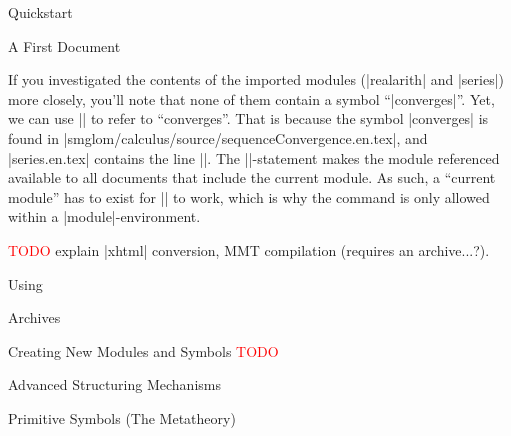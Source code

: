 \begin{sfragment}{Quickstart}
\begin{sfragment}{A First \sTeX Document}
    \begin{function}{\importmodule}
      If you investigated the contents of the imported modules 
      (|realarith| and |series|) more closely, you'll note that
      none of them contain a symbol ``|converges|''. Yet, we
      can use |\symref| to refer to ``converges''. That is because
      the symbol |converges| is found in 
      |smglom/calculus/source/sequenceConvergence.en.tex|, and
      |series.en.tex| contains the line
      ||. The |\importmodule|-statement
      makes the module referenced available to all documents
      that include the current module. As such, a ``current module''
      has to exist for |\importmodule| to work, which is why the command
      is only allowed within a |module|-environment.
    \end{function}

    \textcolor{red}{TODO} explain |xhtml| conversion, MMT compilation
    (requires an archive...?).

	\end{sfragment}
\end{sfragment}

\begin{sfragment}{Using \sTeX}
  
  
  

  
\end{sfragment}

\begin{sfragment}[id=sec.stexarchives]{\sTeX Archives}
  
\end{sfragment}

\begin{sfragment}{Creating New Modules and Symbols}
	\textcolor{red}{TODO}

   
  

  

  

  \begin{sfragment}{Advanced Structuring Mechanisms}
    
  \end{sfragment}
  \begin{sfragment}{Primitive Symbols (The \sTeX Metatheory)}
    
  \end{sfragment}
\end{sfragment}

